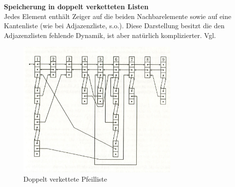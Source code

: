 \textbf{Speicherung in doppelt verketteten Listen}\\
Jedes Element enthält Zeiger auf die beiden Nachbarelemente sowie auf eine Kantenliste (wie bei Adjazenzliste, s.o.).
Diese Darstellung besitzt die den Adjazenzlisten fehlende Dynamik, ist aber natürlich komplizierter.
Vgl. \cite[S.542-544, Speicherung in einer doppelt verketteten Pfeilliste]{OttWid90}
 
\begin{figure}[h]
\centering
\includegraphics[width = 8cm]{./chapters/doppeltVerkettetePfeilliste.jpg}
\caption{Doppelt verkettete Pfeilliste\cite[S.543 Abb 8.7]{OttWid90}
}
\label{a4}
\end{figure}


